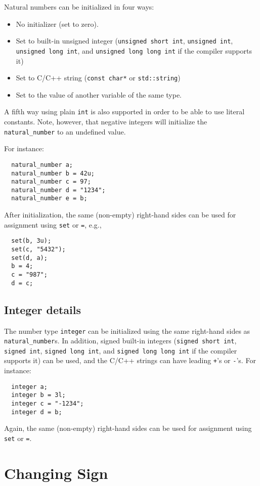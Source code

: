 \documentclass[a4paper]{article}
\begin{document}
Natural numbers can be initialized in four ways:
\begin{itemize}
\item No initializer (set to zero).
\item Set to built-in unsigned integer (\texttt{unsigned short int}, \texttt{unsigned int}, \texttt{unsigned long int}, and \texttt{unsigned long long int} if the compiler supports it)
\item Set to C/C++ string (\texttt{const char*} or \texttt{std::string})
\item Set to the value of another variable of the same type.
\end{itemize}
A fifth way using plain \texttt{int} is also supported in order to be able to use literal constants. Note, however, that negative integers will initialize the \texttt{natural\_number} to an undefined value.

For instance:
\begin{verbatim}
  natural_number a;
  natural_number b = 42u;
  natural_number c = 97;
  natural_number d = "1234";
  natural_number e = b;
\end{verbatim}

After initialization, the same (non-empty) right-hand sides can be used for assignment using \texttt{set} or \texttt{=}, e.g.,
\begin{verbatim}
  set(b, 3u);
  set(c, "5432");
  set(d, a);
  b = 4;
  c = "987";
  d = c;
\end{verbatim}

\subsection{Integer details}

The number type \texttt{integer} can be initialized using the same right-hand sides as \texttt{natural\_number}s. In addition, signed built-in integers (\texttt{signed short int}, \texttt{signed int}, \texttt{signed long int}, and \texttt{signed long long int} if the compiler supports it) can be used, and the C/C++ strings can have leading \texttt{+}'s or \texttt{-}'s. For instance:
\begin{verbatim}
  integer a;
  integer b = 3l;
  integer c = "-1234";
  integer d = b;
\end{verbatim}
Again, the same (non-empty) right-hand sides can be used for assignment using \texttt{set} or \texttt{=}.

\section{Changing Sign}
\end{document}
